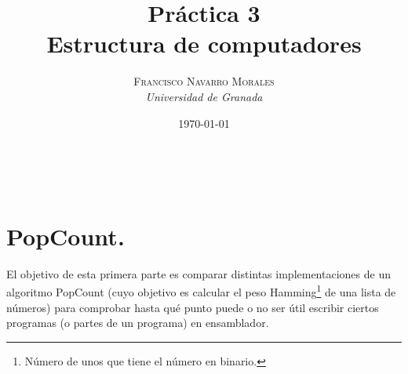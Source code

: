 \documentclass[a4paper, 11pt]{article}
\title{\textbf{Práctica 3}\\ %
Estructura de computadores} %
\author{\textsc{Francisco Navarro Morales} %
\\{\textit{Universidad de Granada}}} %
\date{\today} %
\makeatletter
\renewcommand{\maketitle}{
  \begin{flushright} %
  
  {\LARGE\@title} %
  
  \vspace{50pt} %
  
  {\large\@author} %
  \\\@date %
  \vspace{40pt} %
  \end{flushright}
}
\makeatother
\begin{document}
	


\maketitle %

\renewcommand{\abstractname}{Resumen} %



{\parskip=2pt
  \tableofcontents
}
\ccLogo
\ccAttribution
\ccShareAlike
\ccNonCommercialEU	



\section{PopCount.}
El objetivo de esta primera parte es comparar distintas implementaciones de un algoritmo PopCount (cuyo objetivo es calcular el peso Hamming\footnote{Número de unos que tiene el número en binario.} de una lista de números) para comprobar hasta qué punto puede o no ser útil escribir ciertos programas (o partes de un programa) en ensamblador.
\end{document}
